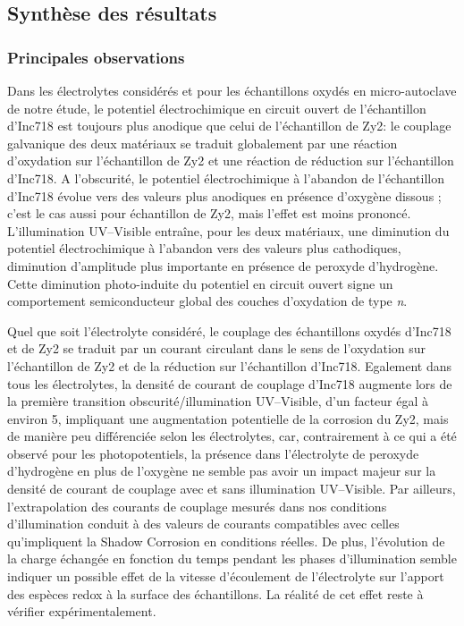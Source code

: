 \begin{refsection}
    
    \subsection{Synthèse des résultats}\label{subsec:ch4_oxygen_summary}

    \subsubsection{Principales observations}\label{subsec:ch4_oxygen_summary_main}
    
    Dans les électrolytes considérés et pour les échantillons oxydés en micro-autoclave de notre étude, le potentiel
    électrochimique en circuit ouvert de l’échantillon d’Inc718 est toujours plus anodique que celui de l’échantillon de
    Zy2:
    le couplage galvanique des deux matériaux se traduit globalement par une réaction d’oxydation sur l’échantillon de Zy2
    et une réaction de réduction sur l’échantillon d’Inc718. A l’obscurité, le potentiel électrochimique à l’abandon de
    l’échantillon d’Inc718 évolue vers des valeurs plus anodiques en présence d’oxygène dissous ; c’est le cas aussi pour
    échantillon de Zy2, mais l’effet est moins prononcé.
    L’illumination UV--Visible entraîne, pour les deux matériaux, une
    diminution du potentiel électrochimique à l’abandon vers des valeurs plus cathodiques, diminution d’amplitude plus
    importante en présence de peroxyde d’hydrogène. Cette diminution photo-induite du potentiel en circuit ouvert signe un
    comportement semiconducteur global des couches d’oxydation de type \emph{n}. 

    Quel que soit l’électrolyte considéré, le couplage des échantillons oxydés d’Inc718 et de Zy2 se traduit par un courant
    circulant dans le sens de l'oxydation sur l’échantillon de Zy2 et de la réduction sur l’échantillon
    d’Inc718. Egalement dans tous les électrolytes, la densité de courant de couplage d’Inc718 augmente lors de la première
    transition obscurité/illumination UV--Visible, d’un facteur égal à environ 5, impliquant une augmentation potentielle de
    la corrosion du Zy2, mais de manière peu différenciée selon les électrolytes, car, contrairement à ce qui a été observé
    pour les photopotentiels, la présence dans l’électrolyte de peroxyde d’hydrogène en plus de l’oxygène ne semble pas
    avoir un impact majeur sur la densité de courant de couplage avec et sans illumination UV--Visible. Par ailleurs,
    l’extrapolation des courants de couplage mesurés dans nos conditions d’illumination conduit à des valeurs de courants
    compatibles avec celles qu’impliquent la Shadow Corrosion en conditions réelles. De plus, l’évolution de la charge
    échangée en fonction du temps pendant les phases d’illumination semble indiquer un possible effet de la vitesse
    d’écoulement de l’électrolyte sur l’apport des espèces redox à la surface des échantillons. La réalité de cet effet
    reste à vérifier expérimentalement.
    

\end{refsection}

